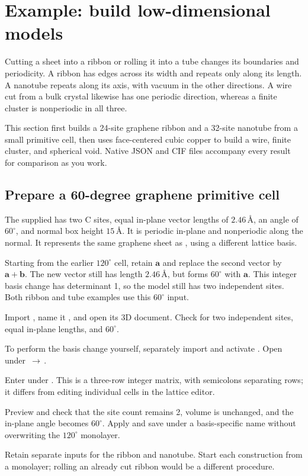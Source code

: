 \section{Example: build low-dimensional models}\label{sec:nanostructure-examples}

Cutting a sheet into a ribbon or rolling it into a tube changes its boundaries and periodicity. A ribbon has edges across its width and repeats only along its length. A nanotube repeats along its axis, with vacuum in the other directions. A wire cut from a bulk crystal likewise has one periodic direction, whereas a finite cluster is nonperiodic in all three.

This section first builds a 24-site graphene ribbon and a 32-site nanotube from a small primitive cell, then uses face-centered cubic copper to build a wire, finite cluster, and spherical void. Native JSON and CIF files accompany every result for comparison as you work.

\subsection{Prepare a 60-degree graphene primitive cell}

The supplied  has two C sites, equal in-plane vector lengths of $2.46\,\text{\AA}$, an angle of $60^\circ$, and normal box height $15\,\text{\AA}$. It is periodic in-plane and nonperiodic along the normal. It represents the same graphene sheet as , using a different lattice basis.

Starting from the earlier $120^\circ$ cell, retain $\mathbf a$ and replace the second vector by $\mathbf a+\mathbf b$. The new vector still has length $2.46\,\text{\AA}$, but forms $60^\circ$ with $\mathbf a$. This integer basis change has determinant 1, so the model still has two independent sites. Both ribbon and tube examples use this $60^\circ$ input.

\begin{steps}
  \item Import , name it , and open its 3D document. Check for two independent sites, equal in-plane lengths, and $60^\circ$.
  \item To perform the basis change yourself, separately import and activate . Open  under \,$\rightarrow$\,.
  \item Enter  under . This is a three-row integer matrix, with semicolons separating rows; it differs from editing individual cells in the lattice editor.
  \item Preview and check that the site count remains 2, volume is unchanged, and the in-plane angle becomes $60^\circ$. Apply and save under a basis-specific name without overwriting the $120^\circ$ monolayer.
  \item Retain separate inputs for the ribbon and nanotube. Start each construction from a monolayer; rolling an already cut ribbon would be a different procedure.
\end{steps}


